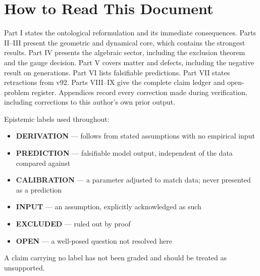 \documentclass[11pt,a4paper]{article}
\begin{document}
\begin{abstract}
What is excluded by theorem. $SO(8)$ cannot be the gauge algebra, by two independent proofs. The Standard Model algebra does not embed in $\mathfrak{so}(8)$ by any route. The anisotropy coefficient $\xi_2 = -1/384$ is not derivable from the stated lattice. Both time-step values stated in v92 violate the framework's own stability bound. Three generations is not a derived result: five candidate mechanisms were tested and all five are closed. Monopole absence, claimed in earlier versions, is inconsistent with an $E_6$ gauge group.

What remains open is stated exhaustively in \S IX, classified by the type of work each item requires. Every correction made during verification --- including corrections to the author's own prior output --- is recorded in the appendices, and every externally attributable claim carries a linked numerical citation.

The framework claims substantially less than v92 did. What it now claims has been checked --- by hand, by simulation, by independent reproduction, and now by machine.
\end{abstract}

\section*{How to Read This Document}
Part I states the ontological reformulation and its immediate consequences. Parts II--III present the geometric and dynamical core, which contains the strongest results. Part IV presents the algebraic sector, including the exclusion theorem and the gauge decision. Part V covers matter and defects, including the negative result on generations. Part VI lists falsifiable predictions. Part VII states retractions from v92. Parts VIII--IX give the complete claim ledger and open-problem register. Appendices record every correction made during verification, including corrections to this author's own prior output.

Epistemic labels used throughout:
\begin{itemize}
\item \textbf{DERIVATION} --- follows from stated assumptions with no empirical input
\item \textbf{PREDICTION} --- falsifiable model output, independent of the data compared against
\item \textbf{CALIBRATION} --- a parameter adjusted to match data; never presented as a prediction
\item \textbf{INPUT} --- an assumption, explicitly acknowledged as such
\item \textbf{EXCLUDED} --- ruled out by proof
\item \textbf{OPEN} --- a well-posed question not resolved here
\end{itemize}
A claim carrying no label has not been graded and should be treated as unsupported.
\end{document}
